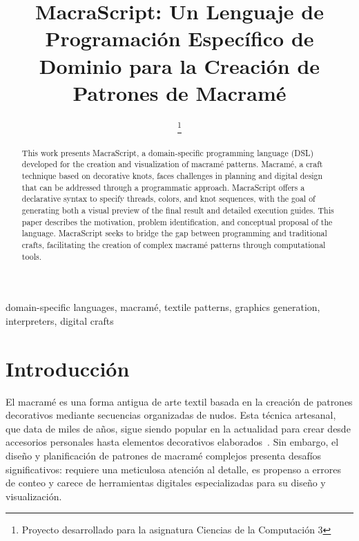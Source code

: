 \documentclass[conference]{IEEEtran}
\begin{document}
\title{MacraScript: Un Lenguaje de Programación Específico de Dominio para la Creación de Patrones de Macramé}

\author{
\thanks{Proyecto desarrollado para la asignatura Ciencias de la Computación 3}}

\maketitle

\begin{abstract}
This work presents MacraScript, a domain-specific programming language (DSL) developed for the creation and visualization of macramé patterns. Macramé, a craft technique based on decorative knots, faces challenges in planning and digital design that can be addressed through a programmatic approach. MacraScript offers a declarative syntax to specify threads, colors, and knot sequences, with the goal of generating both a visual preview of the final result and detailed execution guides. This paper describes the motivation, problem identification, and conceptual proposal of the language. MacraScript seeks to bridge the gap between programming and traditional crafts, facilitating the creation of complex macramé patterns through computational tools.
\end{abstract}

\begin{IEEEkeywords}
domain-specific languages, macramé, textile patterns, graphics generation, interpreters, digital crafts
\end{IEEEkeywords}

\section{Introducción}
El macramé es una forma antigua de arte textil basada en la creación de patrones decorativos mediante secuencias organizadas de nudos. Esta técnica artesanal, que data de miles de años, sigue siendo popular en la actualidad para crear desde accesorios personales hasta elementos decorativos elaborados~\cite{karner2005}. Sin embargo, el diseño y planificación de patrones de macramé complejos presenta desafíos significativos: requiere una meticulosa atención al detalle, es propenso a errores de conteo y carece de herramientas digitales especializadas para su diseño y visualización.
\end{document}
